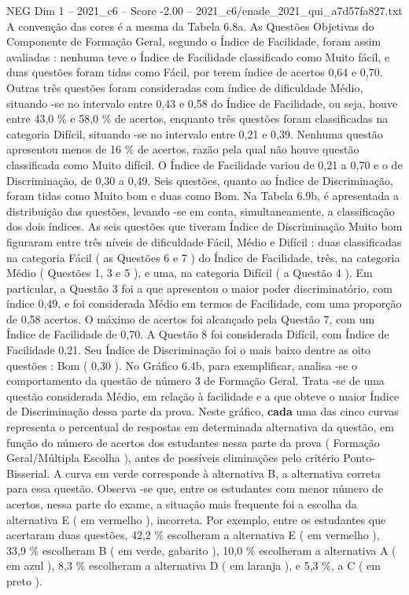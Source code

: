 \begin{textsample}{NEG Dim 1 – 2021\_c6 – Score -2.00 – 2021\_c6/enade\_2021\_qui\_a7d57fa827.txt}
A convenção das cores é a mesma da Tabela 6.8a.
As Questões Objetivas do Componente de Formação Geral, segundo o Índice de Facilidade, foram assim avaliadas : nenhuma teve o Índice de Facilidade classificado como Muito fácil, e duas questões foram tidas como Fácil, por terem índice de acertos 0,64 e 0,70.
Outras três questões foram consideradas com índice de dificuldade Médio, situando -se no intervalo entre 0,43 e 0,58 do Índice de Facilidade, ou seja, houve entre 43,0 \% e 58,0 \% de acertos, enquanto três questões foram classificadas na categoria Difícil, situando -se no intervalo entre 0,21 e 0,39.
Nenhuma questão apresentou menos de 16 \% de acertos, razão pela qual não houve questão classificada como Muito difícil.
O Índice de Facilidade variou de 0,21 a 0,70 e o de Discriminação, de 0,30 a 0,49.
Seis questões, quanto ao Índice de Discriminação, foram tidas como Muito bom e duas como Bom.
Na Tabela 6.9b, é apresentada a distribuição das questões, levando -se em conta, simultaneamente, a classificação dos dois índices.
As seis questões que tiveram Índice de Discriminação Muito bom figuraram entre três níveis de dificuldade Fácil, Médio e Difícil : duas classificadas na categoria Fácil ( as Questões 6 e 7 ) do Índice de Facilidade, três, na categoria Médio ( Questões 1, 3 e 5 ), e uma, na categoria Difícil ( a Questão 4 ).
Em particular, a Questão 3 foi a que apresentou o maior poder discriminatório, com índice 0,49, e foi considerada Médio em termos de Facilidade, com uma proporção de 0,58 acertos.
O máximo de acertos foi alcançado pela Questão 7, com um Índice de Facilidade de 0,70.
A Questão 8 foi considerada Difícil, com Índice de Facilidade 0,21.
Seu Índice de Discriminação foi o mais baixo dentre as oito questões : Bom ( 0,30 ).
No Gráfico 6.4b, para exemplificar, analisa -se o comportamento da questão de número 3 de Formação Geral.
Trata -se de uma questão considerada Médio, em relação à facilidade e a que obteve o maior Índice de Discriminação dessa parte da prova.
Neste gráfico, \textbf{cada} uma das cinco curvas representa o percentual de respostas em determinada alternativa da questão, em função do número de acertos dos estudantes nessa parte da prova ( Formação Geral/Múltipla Escolha ), antes de possíveis eliminações pelo critério Ponto-Bisserial.
A curva em verde corresponde à alternativa B, a alternativa correta para essa questão.
Observa -se que, entre os estudantes com menor número de acertos, nessa parte do exame, a situação mais frequente foi a escolha da alternativa E ( em vermelho ), incorreta.
Por exemplo, entre os estudantes que acertaram duas questões, 42,2 \% escolheram a alternativa E ( em vermelho ), 33,9 \% escolheram B ( em verde, gabarito ), 10,0 \% escolheram a alternativa A ( em azul ), 8,3 \% escolheram a alternativa D ( em laranja ), e 5,3 \%, a C ( em preto ).

\end{textsample}
